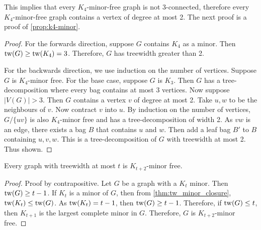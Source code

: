 This implies that every $K_4$-minor-free graph is not $3$-connected, therefore every $K_4$-minor-free graph contains a vertex of degree at most 2. The next proof is a proof of \cref{prop:k4-minor}.

\begin{proof}
	For the forwards direction, suppose $G$ contains $K_4$ as a minor. Then $\operatorname{tw}(G) \geq \operatorname{tw}(K_4) = 3$. Therefore, $G$ has treewidth greater than 2. 

	For the backwards direction, we use induction on the number of vertices. Suppose $G$ is $K_4$-minor free. For the base case, suppose $G$ is $K_3$. Then $G$ has a tree-decomposition where every bag contains at most $3$ vertices. Now suppose $|V(G)| > 3$. Then $G$ contains a vertex $v$ of degree at most 2. Take $u, w$ to be the neighbours of $v$. Now contract $v$ into $u$. By induction on the number of vertices, $G / \{uv\}$ is also $K_4$-minor free and has a tree-decomposition of width 2. As $vw$ is an edge, there exists a bag $B$ that contains $u$ and $w$. Then add a leaf bag $B'$ to $B$ containing $u, v, w$. This is a tree-decomposition of $G$ with treewidth at most 2. Thus shown. 
\end{proof}




\begin{proposition}\label{thm:treewidth_clique-minor-free}
	Every graph with treewidth at most $t$ is $K_{t+2}$-minor free. 
\end{proposition}
\begin{proof}
	Proof by contrapositive. Let $G$ be a graph with a $K_t$ minor. Then \(\operatorname{tw}(G) \geq t-1\).
	If \(K_t\) is a minor of \(G\), then from \cref{thm:tw_minor_closure}, \(\operatorname{tw}(K_t) \leq \operatorname{tw}(G)\). As \(\operatorname{tw}(K_t) = t-1\), then \(\operatorname{tw}(G) \geq t - 1\). Therefore, if $\operatorname{tw}(G) \leq t$, then $K_{t+1}$ is the largest complete minor in $G$. Therefore, $G$ is $K_{t + 2}$-minor free. 
\end{proof}

